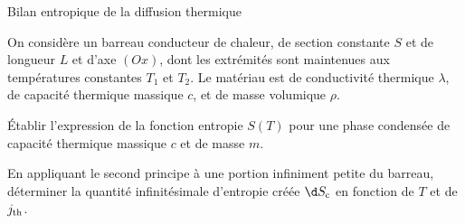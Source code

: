 \begin{exo}[PC][3][TD]{Bilan entropique de la diffusion thermique}

  On considère un barreau conducteur de chaleur, de section constante $S$ et de longueur $L$ et d'axe $(Ox)$, dont les extrémités sont maintenues aux températures constantes $T_1$ et $T_2$. Le matériau est de conductivité thermique $\lambda$, de capacité thermique massique $c$, et de masse volumique $\rho$.

  \begin{quest}
    \item Établir l'expression de la fonction entropie $S(T)$ pour une phase condensée de capacité thermique massique $c$ et de masse $m$.
    \item	En appliquant le second principe à une portion infiniment petite du barreau, déterminer la quantité infinitésimale d'entropie créée $\d S_{\rm c}$ en fonction de $T$ et de $j_{\rm th}$.
\end{quest}
\end{exo}
